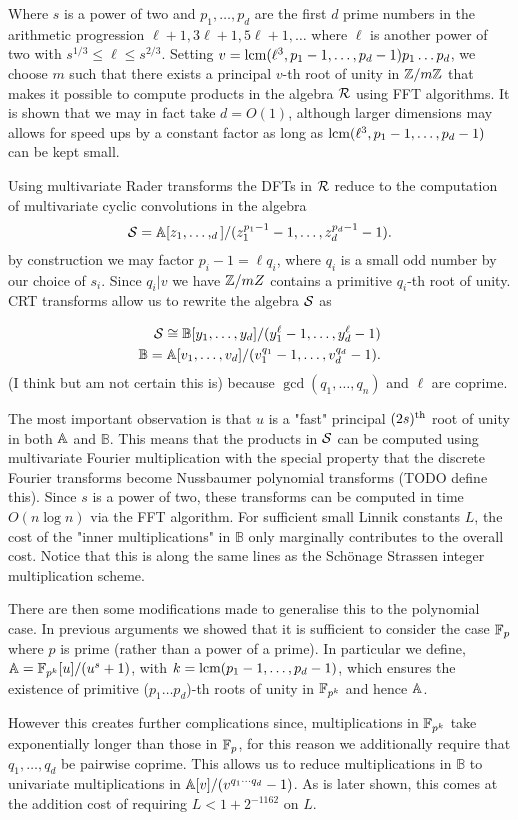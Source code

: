 Where $s$ is a power of two and $p_1, \ldots, p_d$ are the first $d$ prime numbers in the arithmetic progression $\ell + 1, 3\ell + 1, 5\ell + 1, \ldots$ where $\ell$ is another power of two with $s^{1/3} \leq \ell \leq s^{2/3}$.  Setting $v = \textrm{lcm}(\ell^3, p_1 - 1, \ldots, p_d - 1)p_1\dots p_d$, we choose $m$ such that there exists a principal $v$-th root of unity in ${\mathbb Z}/m{\mathbb Z}$ that makes it possible to compute products in the algebra $\mathcal R$ using FFT algorithms. It is shown that we may in fact take $d = O(1)$, although larger dimensions may allows for speed ups by a constant factor as long as $\textrm{lcm}(\ell^3, p_1 - 1, \ldots, p_d - 1)$ can be kept small.

Using multivariate Rader transforms the DFTs in $\mathcal R$ reduce to the computation of multivariate cyclic convolutions in the algebra
\[
    \mathcal S = {\mathbb A}[z_1, \ldots, _d] / (z_1^{p_1 - 1} - 1, \ldots, z_d^{p_d - 1} - 1).
\]
by construction we may factor $p_i - 1 = \ell q_i$, where $q_i$ is a small odd number by our choice of $s_i$. Since $q_i | v$ we have ${\mathbb Z} /mZ$ contains a primitive $q_i$-th root of unity. CRT transforms allow us to rewrite the algebra $\mathcal S$ as

\begin{align*}
    \mathcal S \cong \mathbb{B}[y_1, \ldots, y_d]/(y_1^\ell - 1, \ldots, y_d^\ell - 1)\\
    \mathbb{B} = \mathbb{A}[v_1, \ldots, v_d] / (v_1^{q_1} - 1, \ldots, v_d^{q_d} - 1).
\end{align*}
(I think but am not certain this is) because $\gcd(q_1, \ldots, q_n)$ and $\ell$ are coprime.

The most important observation is that $u$ is a "fast" principal $(2s)^{\textrm{th}}$ root of unity in both ${\mathbb A}$ and $\mathbb{B}$. This means that the products in $\mathcal S$ can be computed using multivariate Fourier multiplication with the special property that the discrete Fourier transforms become Nussbaumer polynomial transforms (TODO define this). Since $s$ is a power of two, these transforms can be computed in time $O(n \log n)$ via the FFT algorithm. For sufficient small Linnik constants $L$, the cost of the "inner multiplications" in $\mathbb{B}$ only marginally contributes to the overall cost. Notice that this is along the same lines as the Sch\"{o}nage Strassen integer multiplication scheme.

There are then some modifications made to generalise this to the polynomial case. In previous arguments we showed that it is sufficient to consider the case ${\mathbb F}_p$ where $p$ is prime (rather than a power of a prime). In particular we define, ${\mathbb A} = {\mathbb F}_{p^k}[u] / (u^s + 1)$, with $k = \textrm{lcm}(p_1 - 1, \ldots, p_d - 1)$, which ensures the existence of primitive ($p_1 \ldots p_d$)-th roots of unity in ${\mathbb F}_{p^k}$ and hence ${\mathbb A}$.

However this creates further complications since, multiplications in ${\mathbb F}_{p^k}$ take exponentially longer than those in ${\mathbb F}_p$, for this reason we additionally require that $q_1, \ldots, q_d$ be pairwise coprime. This allows us to reduce multiplications in $\mathbb{B}$ to univariate multiplications in ${\mathbb A}[v]/(v^{q_1\cdots q_d} - 1)$. As is later shown, this comes at the addition cost of requiring $L < 1 + 2^{-1162}$ on $L$.
